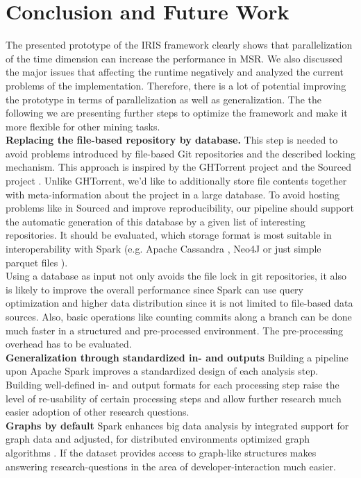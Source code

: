 
\section{Conclusion and Future Work}
\label{conclusion}
The presented prototype of the IRIS framework clearly shows that parallelization of the time dimension can increase the performance in MSR. We also discussed the major issues that affecting the runtime negatively and analyzed the current problems of the implementation. Therefore, there is a lot of potential improving the prototype in terms of parallelization as well as generalization. The the following we are presenting further steps to optimize the framework and make it more flexible for other mining tasks.\\
\textbf{Replacing the file-based repository by database.}
This step is needed to avoid problems introduced by file-based Git repositories and the described locking mechanism. This approach is inspired by the GHTorrent project \cite{Gousios2012, Gousios2015} and the Sourced project \cite{Markovtsev2018}. Unlike GHTorrent, we'd like to additionally store file contents together with meta-information about the project in a large database. To avoid hosting problems like in Sourced and improve reproducibility, our pipeline should support the automatic generation of this database by a given list of interesting repositories. It should be evaluated, which storage format is most suitable in interoperability with Spark (e.g. Apache Cassandra \cite{lakshman2010cassandra}, Neo4J \cite{neo4j} or just simple parquet files \cite{parquet}).\\
Using a database as input not only avoids the file lock in git repositories, it also is likely to improve the overall performance since Spark can use query optimization and higher data distribution since it is not limited to file-based data sources. Also, basic operations like counting commits along a branch can be done much faster in a structured and pre-processed environment. The pre-processing overhead has to be evaluated.\\
\textbf{Generalization through standardized in- and outputs} Building a pipeline upon Apache Spark improves a standardized design of each analysis step. Building well-defined in- and output formats for each processing step raise the level of re-usability of certain processing steps and allow further research much easier adoption of other research questions.\\
\textbf{Graphs by default} Spark enhances big data analysis by integrated support for graph data and adjusted, for distributed environments optimized graph algorithms \cite{graphx}. If the dataset provides access to graph-like structures makes answering research-questions in the area of developer-interaction much easier.\\
